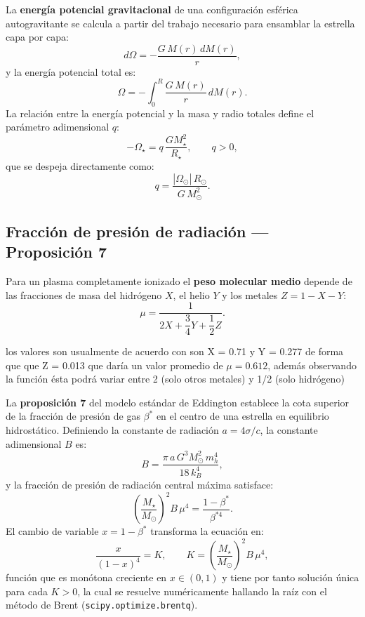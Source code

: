 \documentclass[12pt, a4paper]{article}
\begin{document}
La \textbf{energía potencial gravitacional} de una configuración esférica autogravitante se calcula a partir del trabajo necesario para ensamblar la estrella capa por capa:
\begin{equation}
   d\Omega = -\frac{G\, M(r)\, dM(r)}{r},
\end{equation}
y la energía potencial total es:
\begin{equation}
   \Omega = -\int_0^R \frac{G\, M(r)}{r}\, dM(r).
\end{equation}
La relación entre la energía potencial y la masa y radio totales define el parámetro adimensional $q$:
\begin{equation}
   -\Omega_\star = q\,\frac{G M_\star^2}{R_\star}, \qquad q > 0,
\end{equation}
que se despeja directamente como:
\begin{equation}
   q = \frac{|\Omega_\odot|\, R_\odot}{G\, M_\odot^2}.
\end{equation}


\subsection*{Fracción de presión de radiación --- Proposición 7}
\label{sec:teoria-2b}


Para un plasma completamente ionizado el \textbf{peso molecular medio} depende de las fracciones de masa del hidrógeno $X$, el helio $Y$ y los metales $Z = 1-X-Y$:
\begin{equation}
   \mu = \frac{1}{2X + \dfrac{3}{4}Y + \dfrac{1}{2}Z}.
\end{equation}


los valores son usualmente de acuerdo con \cite{grassitelliSubsonicStructureOptically2018} son X = 0.71 y Y = 0.277 de forma que que Z = 0.013 que daría un valor promedio de $\mu = 0.612$, además observando la función ésta podrá variar entre 2 (solo otros metales) y 1/2 (solo hidrógeno)


La \textbf{proposición 7} del modelo estándar de Eddington establece la cota superior de la fracción de presión de gas $\beta^*$ en el centro de una estrella en equilibrio hidrostático. Definiendo la constante de radiación $a = 4\sigma/c$, la constante adimensional $B$ es:
\begin{equation}
   B = \frac{\pi\, a\, G^3 M_\odot^2\, m_h^4}{18\, k_B^4},
\end{equation}
y la fracción de presión de radiación central máxima satisface:
\begin{equation}
   \left(\frac{M_\star}{M_\odot}\right)^{\!2} B\,\mu^4 = \frac{1 - \beta^*}{\beta^{*4}}.
\end{equation}
El cambio de variable $x = 1 - \beta^*$ transforma la ecuación en:
\begin{equation}
   \frac{x}{(1-x)^4} = K, \qquad K = \left(\frac{M_\star}{M_\odot}\right)^{\!2} B\,\mu^4,
\end{equation}
función que es monótona creciente en $x\in(0,1)$ y tiene por tanto solución única para cada $K>0$, la cual se resuelve numéricamente hallando la raíz con el método de Brent (\texttt{scipy.optimize.brentq}).
\end{document}
